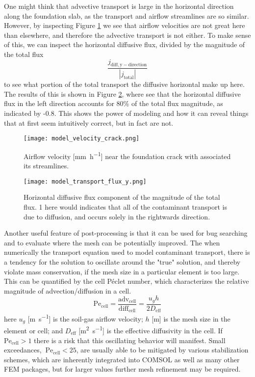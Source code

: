 One might think that advective transport is large in the horizontal direction along the foundation slab, as the transport and airflow streamlines are so similar.
However, by inspecting Figure \ref{fig:model_velocity_crack} we see that airflow velocities are not great here than elsewhere, and therefore the advective transport is not either.
To make sense of this, we can inspect the horizontal diffusive flux, divided by the magnitude of the total flux
\begin{equation}
  \frac{j_\mathrm{diff,y-direction}}{|j_\mathrm{total}|}
\end{equation}
to see what portion of the total transport the diffusive horizontal make up here.
The results of this is shown in Figure \ref{fig:model_horizontal_diff}, where see that the horizontal diffusive flux in the left direction accounts for 80\% of the total flux magnitude, as indicated by -0.8.
This shows the power of modeling and how it can reveal things that at first seem intuitively correct, but in fact are not.\par

\begin{figure}[htb!]
  \texttt{[image: model\_velocity\_crack.png]}
  \caption{Airflow velocity [\si{\milli\metre\per\hour}] near the foundation crack with associated its streamlines.}
  \label{fig:model_velocity_crack}
\end{figure}

\begin{figure}[htb!]
  \texttt{[image: model\_transport\_flux\_y.png]}
  \caption{Horizontal diffusive flux component of the magnitude of the total flux. 1 here would indicates that all of the contaminant transport is due to diffusion, and occurs solely in the rightwards direction.}
  \label{fig:model_horizontal_diff}
\end{figure}

Another useful feature of post-processing is that it can be used for bug searching and to evaluate where the mesh can be potentially improved.
The when numerically the transport equation used to model contaminant transport, there is a tendency for the solution to oscillate around the "true" solution, and thereby violate mass conservation, if the mesh size in a particular element is too large.
This can be quantified by the cell Péclet number, which characterizes the relative magnitude of advection/diffusion in a cell.
\begin{equation}
  \mathrm{Pe_{cell}} = \frac{\mathrm{adv_{cell}}}{\mathrm{diff_{cell}}} = \frac{u_g h}{2 D_\mathrm{eff}}
\end{equation}
here $u_g$ [\si{\metre\per\second}] is the soil-gas airflow velocity;
$h$ [\si{\metre}] is the mesh size in the element or cell;
and $D_\mathrm{eff}$ [\si{\metre\squared\per\second}] is the effective diffusivity in the cell.
If $\mathrm{Pe_{cell}} > 1$ there is a risk that this oscillating behavior will manifest.
Small exceedances, $~\mathrm{Pe_{cell}} < 25$, are usually able to be mitigated by various stabilization schemes, which are inherently integrated into COMSOL as well as many other FEM packages, but for larger values further mesh refinement may be required.\par

